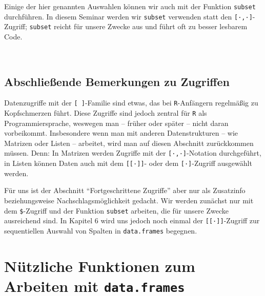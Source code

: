 \documentclass[12pt,]{tufte-book}
\theoremstyle{definition}
\theoremstyle{definition}
\theoremstyle{definition}
\theoremstyle{remark}
\begin{document}
Einige der hier genannten Auswahlen können wir auch mit der Funktion
\texttt{subset} durchführen. In diesem Seminar werden wir
\texttt{subset} verwenden statt den \texttt{{[}·,·{]}}-Zugriff;
\texttt{subset} reicht für unsere Zwecke aus und führt oft zu besser
lesbarem Code.

~


\subsection{Abschließende Bemerkungen zu
Zugriffen}\label{abschlieuxdfende-bemerkungen-zu-zugriffen}

Datenzugriffe mit der \texttt{{[}\ {]}}-Familie sind etwas, das bei
\texttt{R}-Anfängern regelmäßig zu Kopfschmerzen führt. Diese Zugriffe
sind jedoch zentral für \texttt{R} als Programmiersprache, weswegen man
-- früher oder später -- nicht daran vorbeikommt. Insbesondere wenn man
mit anderen Datenstrukturen -- wie Matrizen oder Listen -- arbeitet,
wird man auf diesen Abschnitt zurückkommen müssen. Denn: In Matrizen
werden Zugriffe mit der \texttt{{[}·,·{]}}-Notation durchgeführt, in
Listen können Daten auch mit dem \texttt{{[}{[}·{]}{]}}- oder dem
\texttt{{[}·{]}}-Zugriff ausgewählt werden.

Für uns ist der Abschnitt ``Fortgeschrittene Zugriffe'' aber nur als
Zusatzinfo beziehungsweise Nachschlagsmöglichkeit gedacht. Wir werden
zunächst nur mit dem \texttt{\$}-Zugriff und der Funktion
\texttt{subset} arbeiten, die für unsere Zwecke ausreichend sind. In
Kapitel 6 wird uns jedoch noch einmal der \texttt{{[}{[}·{]}{]}}-Zugriff
zur sequentiellen Auswahl von Spalten in \texttt{data.frames} begegnen.

\hypertarget{convenient}{\section{\texorpdfstring{Nützliche Funktionen
zum Arbeiten mit
\texttt{data.frames}}{Nützliche Funktionen zum Arbeiten mit data.frames}}\label{convenient}}
\end{document}
